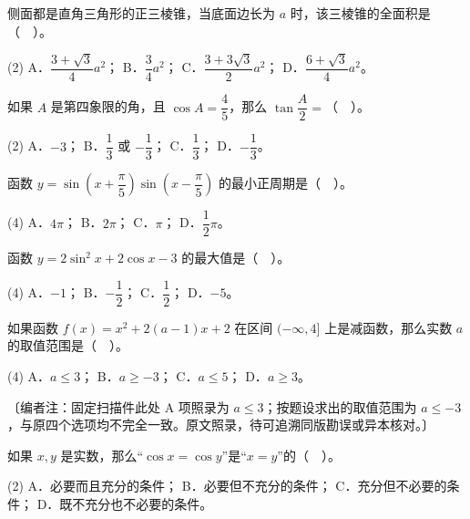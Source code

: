 \begin{question}
侧面都是直角三角形的正三棱锥，当底面边长为 $a$ 时，该三棱锥的全面积是（　）。

\begin{gkopts}(2)
\task A．$\dfrac{3+\sqrt3}{4}a^2$；
\task B．$\dfrac34a^2$；
\task C．$\dfrac{3+3\sqrt3}{2}a^2$；
\task D．$\dfrac{6+\sqrt3}{4}a^2$。
\end{gkopts}

\end{question}
\begin{question}
如果 $A$ 是第四象限的角，且 $\cos A=\dfrac45$，那么 $\tan\dfrac A2=$（　）。

\begin{gkopts}(2)
\task A．$-3$；
\task B．$\dfrac13$ 或 $-\dfrac13$；
\task C．$\dfrac13$；
\task D．$-\dfrac13$。
\end{gkopts}

\end{question}
\begin{question}
函数 $y=\sin\left(x+\dfrac\pi5\right)\sin\left(x-\dfrac\pi5\right)$ 的最小正周期是（　）。

\begin{gkopts}(4)
\task A．$4\pi$；
\task B．$2\pi$；
\task C．$\pi$；
\task D．$\dfrac12\pi$。
\end{gkopts}

\end{question}
\begin{question}
函数 $y=2\sin^2x+2\cos x-3$ 的最大值是（　）。

\begin{gkopts}(4)
\task A．$-1$；
\task B．$-\dfrac12$；
\task C．$\dfrac12$；
\task D．$-5$。
\end{gkopts}

\end{question}
\begin{question}
如果函数 $f(x)=x^2+2(a-1)x+2$ 在区间 $(-\infty,4]$ 上是减函数，那么实数 $a$ 的取值范围是（　）。

\begin{gkopts}(4)
\task A．$a\le3$；
\task B．$a\ge-3$；
\task C．$a\le5$；
\task D．$a\ge3$。
\end{gkopts}
〔编者注：固定扫描件此处 A 项照录为 $a\le3$；按题设求出的取值范围为 $a\le-3$，与原四个选项均不完全一致。原文照录，待可追溯同版勘误或异本核对。〕

\end{question}
\begin{question}
如果 $x,y$ 是实数，那么“$\cos x=\cos y$”是“$x=y$”的（　）。

\begin{gkopts}(2)
\task A．必要而且充分的条件；
\task B．必要但不充分的条件；
\task C．充分但不必要的条件；
\task D．既不充分也不必要的条件。
\end{gkopts}

\end{question}
